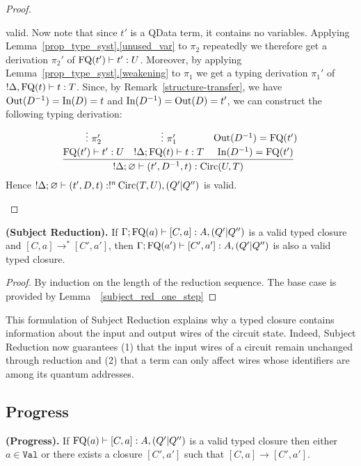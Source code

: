 \documentclass[twoside]{article}
\begin{document}
\begin{proof}
\begin{description}
\begin{itemize}
  valid. Now note that since $t'$ is a QData term, it contains no variables. 
  Applying Lemma~\hyperref[unused_var]{\ref*{prop_type_syst}.\ref*{unused_var}} 
  to $\pi_2$ repeatedly we therefore get a derivation $\pi_2'$ of 
  $\mathop{\textrm{FQ}}\nolimits(t')\vdash t':U$. Moreover, by applying
  Lemma~\hyperref[weakening]{\ref*{prop_type_syst}.\ref*{weakening}} to $\pi_1$ 
  we get a typing derivation $\pi_1'$ of $!\Delta ,\mathop{\textrm{FQ}}\nolimits(t)\vdash t:T$.
  Since, by 
  Remark~\hyperref[structure-transfer]{\ref*{structure-transfer}}, 
  we have $\mathop{\textrm{Out}}\nolimits(D^{-1})=\mathop{\textrm{In}}\nolimits(D)=t$ and $\mathop{\textrm{In}}\nolimits(D^{-1})=\mathop{\textrm{Out}}\nolimits(D)=t'$, we can construct 
  the following typing derivation:
  \[
  \infer[]{!\Delta ;\varnothing\entails (t',D^{-1},t):\Circ(U,T)}{
    \deduce[]{\FQ(t')\entails t':U}{
      \vdots ~\pi_2'
    }
    &
    \deduce[]{!\Delta;\FQ(t)\entails t:T}{
      \vdots ~\pi_1'     
    }
    &
    \deduce[]{\In(D^{-1})=\FQ(t')}{
      \Out(D^{-1})=\FQ(t')
    }
  }  
  \]
  Hence $!\Delta;\varnothing\vdash (t',D,t):!^n\mathop{\textrm{Circ}}\nolimits(T,U),(Q'|Q'')$ 
  is valid.    
\end{itemize}
\end{description}
\end{proof}

\begin{corollary}
{\bf (Subject Reduction).}
If $\Gamma;\mathop{\textrm{FQ}}\nolimits(a)\vdash [C,a]:A,(Q'|Q'')$ is a valid typed closure 
and $[C,a]\to^* [C',a']$, then $\Gamma;\mathop{\textrm{FQ}}\nolimits(a')\vdash [C',a']:A,(Q'|Q'')$ 
is also a valid typed closure.
\end{corollary}

\begin{proof}
By induction on the length of the reduction sequence. The base case is 
provided by Lemma~~\hyperref[subject_red_one_step]{\ref*{subject_red_one_step}}
\end{proof}

This formulation of Subject Reduction explains why a typed closure contains 
information about the input and output wires of the circuit state. Indeed, 
Subject Reduction now guarantees (1) that the input wires of a circuit 
remain unchanged through reduction and (2) that a term can only affect 
wires whose identifiers are among its quantum addresses.

\subsection{Progress}

\begin{proposition}
{\bf (Progress).}
If $\mathop{\textrm{FQ}}\nolimits(a)\vdash [C,a]:A,(Q'|Q'')$ is a valid typed closure then either 
$a\in\mathtt{Val}$ or there exists a closure $[C',a']$ such that 
$[C,a]\to [C',a']$.
\end{proposition}
\end{document}
